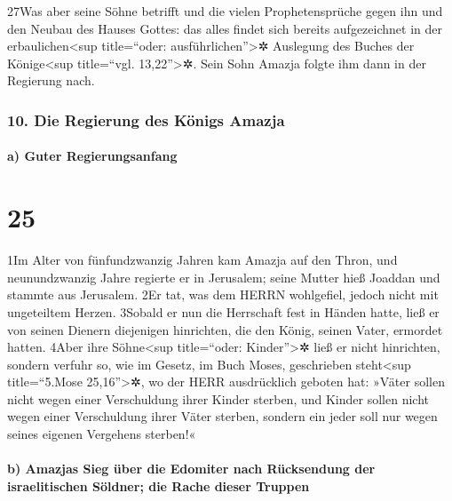 27Was aber seine Söhne betrifft und die vielen Prophetensprüche gegen
ihn und den Neubau des Hauses Gottes: das alles findet sich bereits
aufgezeichnet in der erbaulichen\textless sup title=``oder:
ausführlichen''\textgreater✲ Auslegung des Buches der
Könige\textless sup title=``vgl. 13,22''\textgreater✲. Sein Sohn Amazja
folgte ihm dann in der Regierung nach.

\hypertarget{die-regierung-des-kuxf6nigs-amazja}{%
\subsubsection{10. Die Regierung des Königs
Amazja}\label{die-regierung-des-kuxf6nigs-amazja}}

\hypertarget{a-guter-regierungsanfang}{%
\paragraph{a) Guter Regierungsanfang}\label{a-guter-regierungsanfang}}

\hypertarget{section-24}{%
\section{25}\label{section-24}}

1Im Alter von fünfundzwanzig Jahren kam Amazja auf den Thron, und
neunundzwanzig Jahre regierte er in Jerusalem; seine Mutter hieß Joaddan
und stammte aus Jerusalem. 2Er tat, was dem HERRN wohlgefiel, jedoch
nicht mit ungeteiltem Herzen. 3Sobald er nun die Herrschaft fest in
Händen hatte, ließ er von seinen Dienern diejenigen hinrichten, die den
König, seinen Vater, ermordet hatten. 4Aber ihre Söhne\textless sup
title=``oder: Kinder''\textgreater✲ ließ er nicht hinrichten, sondern
verfuhr so, wie im Gesetz, im Buch Moses, geschrieben steht\textless sup
title=``5.Mose 25,16''\textgreater✲, wo der HERR ausdrücklich geboten
hat: »Väter sollen nicht wegen einer Verschuldung ihrer Kinder sterben,
und Kinder sollen nicht wegen einer Verschuldung ihrer Väter sterben,
sondern ein jeder soll nur wegen seines eigenen Vergehens sterben!«

\hypertarget{b-amazjas-sieg-uxfcber-die-edomiter-nach-ruxfccksendung-der-israelitischen-suxf6ldner-die-rache-dieser-truppen}{%
\paragraph{b) Amazjas Sieg über die Edomiter nach Rücksendung der
israelitischen Söldner; die Rache dieser
Truppen}\label{b-amazjas-sieg-uxfcber-die-edomiter-nach-ruxfccksendung-der-israelitischen-suxf6ldner-die-rache-dieser-truppen}}


